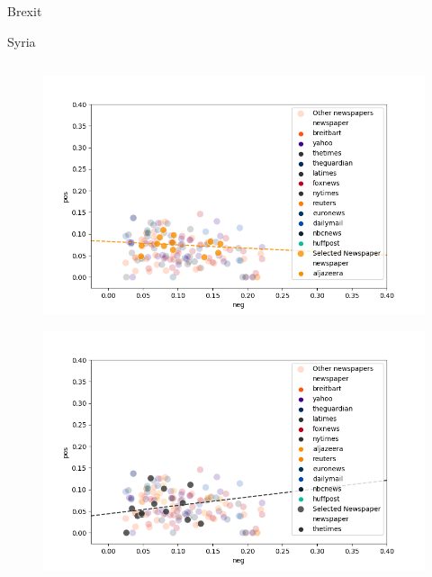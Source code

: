 \documentclass[final]{beamer}
\newlength{\twocolwid}
\begin{document}
\begin{frame}[t]
\begin{columns}[t]
\begin{column}{\twocolwid}
\begin{block}{Brexit {}}
\end{block}


\begin{block}{Syria}
    \begin{columns}
        \begin{column}{.45\textwidth}
            \begin{figure}
                \centering
                \begin{minipage}{.5\textwidth}
                \centering
                \includegraphics[width=\linewidth]{poster/syria_5_al.png}
                \label{fig:test1}
                \end{minipage}%
                \begin{minipage}{.5\textwidth}
                \centering
                \includegraphics[width=\linewidth]{poster/syria_5_thetimes.png}
                \label{fig:test2}
                \end{minipage}
            \end{figure}
        \end{column}


\end{columns}
\end{block}
\end{column}
\end{columns}
\end{frame}
\end{document}

